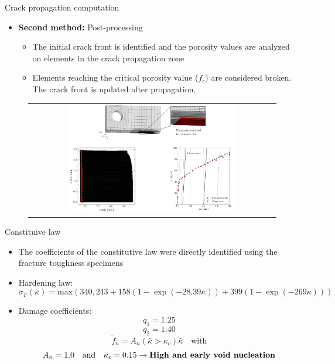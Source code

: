 \documentclass[9pt]{beamer}
\begin{document}
\begin{frame}{Crack propagation computation}

\begin{itemize}
	\item \textbf{Second method:} Post-processing
	\vspace{0.15cm}
	\begin{itemize}
	\item The initial crack front is identified and the porosity values are analyzed on elements in the crack propagation zone
	\vspace{0.15cm}
	\item Elements reaching the critical porosity value ($f_c$) are considered broken. The crack front is updated after propagation.
	\end{itemize}
\end{itemize}

\vspace{0.15cm}

\begin{figure}
        \begin{tabular}{c}
            \includegraphics[width=0.7\textwidth]{Images/post_processing_technique.pdf} \\
        \end{tabular}
    \end{figure}

\end{frame}


\begin{frame}{Constituive law}

    \begin{itemize}
        \item The coefficients of the constitutive law were directly identified using the fracture toughness specimens
        \vspace{0.35cm}
        \item Hardening law: 
        $$\sigma_F(\kappa) = \textrm{max}(340, 243 + 158 (1-\exp(-28.39 \kappa)) + 399 (1-\exp(-269 \kappa)))$$
        \item Damage coefficients:
        $$ q_1 = 1.25$$ 
        $$ q_2 =  1.40$$
        $$ \dot{f}_n = A_n (\bar{\kappa} > \kappa_c) \dot{\bar{\kappa}} \quad \textrm{with}$$ $$A_n = 1.0 \quad \textrm{and} \quad \kappa_c = 0.15 \rightarrow \textrm{\textbf{High and early void nucleation}}$$
    \end{itemize}

\end{frame}  
\end{document}
